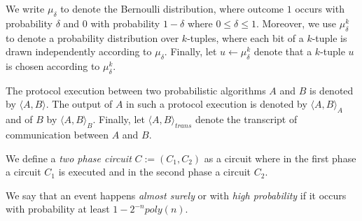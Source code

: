 \noindent
We write $\mu_{\delta}$ to denote the Bernoulli distribution, where outcome $1$ occurs with
probability $\delta$ and $0$ with probability $1-\delta$ where $0 \leq \delta \leq 1$.
Moreover, we use $\mu_{\delta}^k$ to denote a probability distribution over $k$-tuples,
where each bit of a $k$-tuple is drawn independently according to $\mu_{\delta}$.
Finally, let $u \leftarrow \mu_{\delta}^k$ denote that a $k$-tuple $u$ is chosen according to $\mu_{\delta}^k$.

The protocol execution between two probabilistic algorithms $A$ and $B$ is denoted by $\langle A, B \rangle$.
The output of $A$ in such a protocol execution is denoted by $\langle A, B \rangle_A$ and of $B$ by $\langle A, B \rangle_B$.
Finally, let $\langle A, B \rangle_{\mathit{trans}}$ denote the transcript of communication between $A$ and $B$.

We define a \textit{two phase circuit} $C := (C_1, C_2)$ as a circuit where in the first phase a circuit $C_1$
is executed and in the second phase a circuit $C_2$.

We say that an event happens \textit{almost surely} or with \textit{high probability} if
it occurs with probability at least $1 - 2^{-n} \mathit{poly}(n)$.

